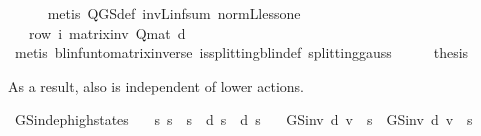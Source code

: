 \begin{isabellebody}
\ \ \ \ \isamarkupfalse%
\ {\isacharparenleft}{\kern0pt}metis\ Q{\isacharunderscore}{\kern0pt}GS{\isacharunderscore}{\kern0pt}def\ inv\isactrlsub L{\isacharunderscore}{\kern0pt}inf{\isacharunderscore}{\kern0pt}sum\ norm{\isacharunderscore}{\kern0pt}{\isasymP}\isactrlsub L{\isacharunderscore}{\kern0pt}less{\isacharunderscore}{\kern0pt}one{\isacharparenright}{\kern0pt}\isanewline
\ \ \isamarkupfalse%
\ \isamarkupfalse%
\ {\isachardoublequoteopen}{\isasymdots}\ {\isacharequal}{\kern0pt}\ row\ i\ {\isacharparenleft}{\kern0pt}matrix{\isacharunderscore}{\kern0pt}inv\ {\isacharparenleft}{\kern0pt}Q{\isacharunderscore}{\kern0pt}mat\ d{\isacharprime}{\kern0pt}{\isacharparenright}{\kern0pt}{\isacharparenright}{\kern0pt}{\isachardoublequoteclose}\isanewline
\ \ \ \ \isamarkupfalse%
\ {\isacharparenleft}{\kern0pt}metis\ blinfun{\isacharunderscore}{\kern0pt}to{\isacharunderscore}{\kern0pt}matrix{\isacharunderscore}{\kern0pt}inverse{\isacharparenleft}{\kern0pt}{}{\isacharparenright}{\kern0pt}\ is{\isacharunderscore}{\kern0pt}splitting{\isacharunderscore}{\kern0pt}blin{\isacharunderscore}{\kern0pt}def{\isacharprime}{\kern0pt}\ splitting{\isacharunderscore}{\kern0pt}gauss{\isacharparenright}{\kern0pt}\isanewline
\ \ \isamarkupfalse%
\ \isamarkupfalse%
\ {\isacharquery}{\kern0pt}thesis\isacommand{{\isachardot}{\kern0pt}}\isamarkupfalse%
\isanewline
{}\isamarkupfalse%
%
\endisatagproof
{\isafoldproof}%
%
\isadelimproof
%
\endisadelimproof
%
\begin{isamarkuptext}%
As a result, also  is independent of lower actions.%
\end{isamarkuptext}\isamarkuptrue%
\isamarkupfalse%
\ GS{\isacharunderscore}{\kern0pt}indep{\isacharunderscore}{\kern0pt}high{\isacharunderscore}{\kern0pt}states{\isacharcolon}{\kern0pt}\isanewline
\ \ \ {\isachardoublequoteopen}{\isasymAnd}s{\isacharprime}{\kern0pt}{\isachardot}{\kern0pt}\ s{\isacharprime}{\kern0pt}\ {\isasymle}\ s\ {\isasymLongrightarrow}\ d\ s{\isacharprime}{\kern0pt}\ {\isacharequal}{\kern0pt}\ d{\isacharprime}{\kern0pt}\ s{\isacharprime}{\kern0pt}{\isachardoublequoteclose}\isanewline
\ \ \ {\isachardoublequoteopen}GS{\isacharunderscore}{\kern0pt}inv\ d\ v\ {\isachardollar}{\kern0pt}\ s\ {\isacharequal}{\kern0pt}\ GS{\isacharunderscore}{\kern0pt}inv\ d{\isacharprime}{\kern0pt}\ v\ {\isachardollar}{\kern0pt}\ s{\isachardoublequoteclose}\isanewline

\end{isabellebody}
